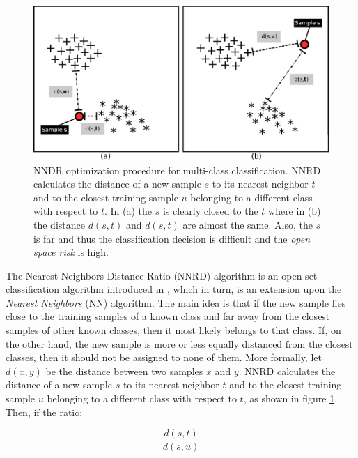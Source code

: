 \begin{figure}[t]
	\begin{center}
    	\includegraphics[scale=0.70]{Figures/NNDR_diagrams.eps}
		\caption{NNDR optimization procedure for multi-class classification. NNRD calculates the distance of a new sample $s$ to its nearest neighbor $t$ and to the closest training sample $u$ belonging to a different class with respect to $t$. In (a) the $s$ is clearly closed to the $t$ where in (b) the distance $d(s,t)$ and $d(s,t)$ are almost the same. Also, the $s$ is far and thus the classification decision is difficult and the \textit{open space risk} is high.}
		\label{chap:openset:fig:NNDR_single_decision}
	\end{center}
\end{figure}

The Nearest Neighbors Distance Ratio (NNRD) algorithm is an open-set classification algorithm introduced in , which in turn, is an extension upon the \textit{Nearest Neighbors} (NN) algorithm. The main idea is that if the new sample lies close to the training samples of a known class and far away from the closest samples of other known classes, then it most likely belongs to that class. If, on the other hand, the new sample is more or less equally distanced from the closest classes, then it should not be assigned to none of them. More formally, let $d(x,y)$ be the distance between two samples $x$ and $y$. NNRD calculates the distance of a new sample $s$ to its nearest neighbor $t$ and to the closest training sample $u$ belonging to a different class with respect to $t$, as shown in figure \ref{chap:openset:fig:NNDR_single_decision}. Then, if the ratio: 

\begin{equation}
    \frac{d(s,t)}{d(s,u)}
\end{equation}

